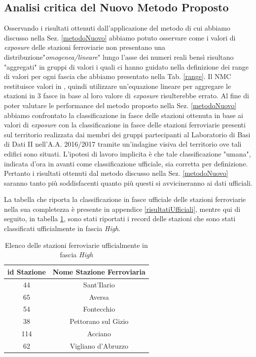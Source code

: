 \subsection{Analisi critica del Nuovo Metodo Proposto}
\label{analisicritica}
Osservando i risultati ottenuti dall'applicazione del metodo di cui abbiamo discusso nella Sez. \ref{metodoNuovo} abbiamo potuto osservare come i valori di \textit{exposure} delle stazioni ferroviarie non presentano una distribuzione\newline "\textit{omogenea/lineare}" lungo l'asse dei numeri reali bensì risultano "aggregati" in gruppi di valori i quali ci hanno guidato nella definizione dei range di valori per ogni fascia che abbiamo presentato nella Tab. \ref{range}.
Il NMC restituisce valori in , quindi utilizzare un'equazione lineare per aggregare le stazioni in 3 fasce in base al loro valore di \textit{exposure} risulterebbe errato.
Al fine di poter valutare le performance del metodo proposto nella Sez. \ref{metodoNuovo} abbiamo confrontato la classificazione in fasce delle stazioni ottenuta in base ai valori di \textit{exposure} con la classificazione in fasce delle stazioni ferroviarie presenti sul territorio realizzata dai membri dei gruppi partecipanti al Laboratorio di Basi di Dati II nell'A.A. 2016/2017 tramite un'indagine visiva del territorio ove tali edifici sono situati. L'ipotesi di lavoro implicita è che tale classificazione "umana", indicata d'ora in avanti come classificazione ufficiale, sia corretta per definizione. Pertanto i risultati ottenuti dal metodo discusso nella Sez. \ref{metodoNuovo} saranno tanto più soddisfacenti quanto più questi si avvicineranno ai dati ufficiali.

La tabella che riporta la classificazione in fasce ufficiale delle stazioni ferroviarie nella sua completezza è presente in appendice \ref{risultatiUfficiali}, mentre qui di seguito, in tabella \ref{fasciaHighUfficiale}, sono stati riportati i record delle stazioni che sono stati classificati ufficialmente in fascia \textit{High}.
\newpage
\begin{table}[h]
\centering
\begin{tabular}{|c|c|}
\hline
\rowcolor{lightgray}
\textbf{id Stazione} & \textbf{Nome Stazione Ferroviaria} \\
\hline
\rowcolor{flamingopink}
44 & Sant'Ilario \\
\hline
\rowcolor{flamingopink}
65 & Aversa \\\hline
\rowcolor{flamingopink}
54 & Fontecchio \\\hline
\rowcolor{flamingopink}
38 & Pettorano sul Gizio \\\hline
\rowcolor{flamingopink}
114 & Acciano \\\hline
\rowcolor{flamingopink}
62 & Vigliano d'Abruzzo \\
\hline
\end{tabular}
\caption{Elenco delle stazioni ferroviarie ufficialmente in fascia \textit{High}}
\label{fasciaHighUfficiale}
\end{table}

